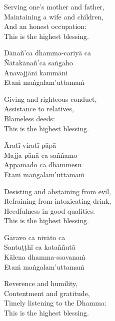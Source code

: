 \begin{english-verses}
  Serving one's mother and father,\\
  Maintaining a wife and children,\\
  And an honest occupation:\\
  This is the highest blessing.
\end{english-verses}

\begin{pali-hang-continued}
  Dānañ'ca dhamma-cariyā ca\\
  Ñātakānañ'ca saṅgaho\\
  Anavajjāni kammāni\\
  Etaṁ maṅgalam'uttamaṁ
\end{pali-hang-continued}

\begin{english-verses}
  Giving and righteous conduct,\\
  Assistance to relatives,\\
  Blameless deeds:\\
  This is the highest blessing.
\end{english-verses}

\begin{pali-hang-continued}
  Āratī viratī pāpā\\
  Majja-pānā ca saññamo\\
  Appamādo ca dhammesu\\
  Etaṁ maṅgalam'uttamaṁ
\end{pali-hang-continued}

\begin{english-verses}
  Desisting and abstaining from evil,\\
  Refraining from intoxicating drink,\\
  Heedfulness in good qualities:\\
  This is the highest blessing.
\end{english-verses}

\begin{pali-hang-continued}
  Gāravo ca nivāto ca\\
  Santuṭṭhī ca kataññutā\\
  Kālena dhamma-ssavanaṁ\\
  Etaṁ maṅgalam'uttamaṁ
\end{pali-hang-continued}

\begin{english-verses}
  Reverence and humility,\\
  Contentment and gratitude,\\
  Timely listening to the Dhamma:\\
  This is the highest blessing.
\end{english-verses}

